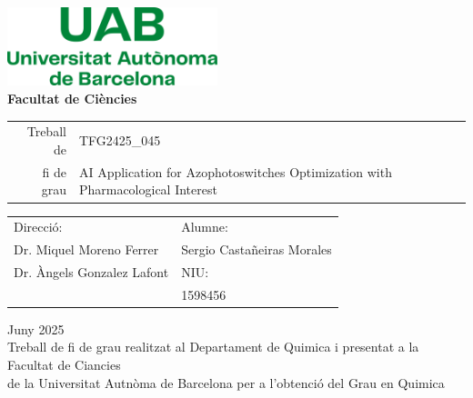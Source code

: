 \documentclass[11pt]{article}
\newcommand\NomComplet{Sergio Castañeiras Morales}
\newcommand\NIU{1598456}
\newcommand\NomProfeA{Dr. Miquel Moreno Ferrer}
\newcommand\NomProfeB{Dr. Àngels Gonzalez Lafont}
\newcommand\CodiTFG{TFG2425\_045}
\newcommand\TitolTFG{AI Application for Azophotoswitches Optimization with Pharmacological Interest}
\newcommand\NomCentre{Departament de Quimica } %
\newcommand\NomGrau{Quimica}
\newcommand\Mes{Juny } %
\newcommand\Any{2025}
\begin{document}
\begin{titlepage}

\center %


\includegraphics[width = 6.1cm]{GeneralSources/Logo_uab.png}\\[1.76cm] %


\textbf{\LARGE Facultat de Ciències}\\[3.53cm] %
\begin{flushright}
\begin{tabular}{r | p{}}
  {\Large Treball de} & {\LARGE \CodiTFG}\\
  {\LARGE fi de grau}  & {\LARGE \TitolTFG}
\end{tabular}
\end{flushright}\vspace{5.06cm}




\begin{tabular}{p{} p{}}
\large
Direcció: & Alumne: \\
\NomProfeA & \NomComplet\\
\NomProfeB & NIU: \\
 & \NIU
\end{tabular}
\vspace{0.5cm}



{\Large \Mes \Any}\\[0.5cm] %

Treball de fi de grau realitzat al \NomCentre i presentat a la\\ Facultat de Ciancies\\ de la Universitat Autnòma de Barcelona per a l'obtenció del Grau en \NomGrau


\end{titlepage}
\end{document}

